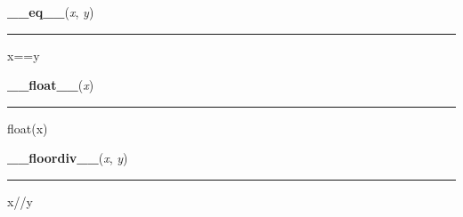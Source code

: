     \label{numpy:ndarray:__eq__}

    \vspace{0.5ex}

    \begin{boxedminipage}{\textwidth}

    \raggedright \textbf{\_\_eq\_\_}(\textit{x}, \textit{y})

    \vspace{-1.5ex}

    \rule{\textwidth}{0.5\fboxrule}

x==y
    \vspace{1ex}

    \end{boxedminipage}

    \label{numpy:ndarray:__float__}

    \vspace{0.5ex}

    \begin{boxedminipage}{\textwidth}

    \raggedright \textbf{\_\_float\_\_}(\textit{x})

    \vspace{-1.5ex}

    \rule{\textwidth}{0.5\fboxrule}

float(x)
    \vspace{1ex}

    \end{boxedminipage}

    \label{numpy:ndarray:__floordiv__}

    \vspace{0.5ex}

    \begin{boxedminipage}{\textwidth}

    \raggedright \textbf{\_\_floordiv\_\_}(\textit{x}, \textit{y})

    \vspace{-1.5ex}

    \rule{\textwidth}{0.5\fboxrule}

x//y
    \vspace{1ex}

    \end{boxedminipage}

    \label{numpy:ndarray:__ge__}

